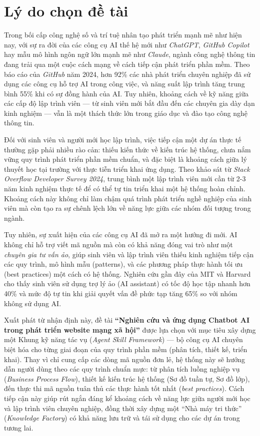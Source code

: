 \documentclass[13pt,a4paper,oneside]{extreport}
\numberwithin{equation}{chapter}
\numberwithin{figure}{chapter}
\numberwithin{table}{chapter}
\begin{document}
\section*{Lý do chọn đề tài}

Trong bối cấp công nghệ số và trí tuệ nhân tạo phát triển mạnh mẽ như hiện nay, với sự ra đời của các công cụ AI thế hệ mới như \textit{ChatGPT}, \textit{GitHub Copilot} hay mẫu mô hình ngôn ngữ lớn mạnh mẽ như \textit{Claude}, ngành công nghệ thông tin đang trải qua một cuộc cách mạng về cách tiếp cận phát triển phần mềm. Theo báo cáo của \textit{GitHub} năm 2024, hơn 92\% các nhà phát triển chuyên nghiệp đã sử dụng các công cụ hỗ trợ AI trong công việc, và năng suất lập trình tăng trung bình 55\% khi có sự đồng hành của AI. Tuy nhiên, khoảng cách về kỹ năng giữa các cấp độ lập trình viên — từ sinh viên mới bắt đầu đến các chuyên gia dày dạn kinh nghiệm — vẫn là một thách thức lớn trong giáo dục và đào tạo công nghệ thông tin.

Đối với sinh viên và người mới học lập trình, việc tiếp cận một dự án thực tế thường gặp phải nhiều rào cản: thiếu kiến thức về kiến trúc hệ thống, chưa nắm vững quy trình phát triển phần mềm chuẩn, và đặc biệt là khoảng cách giữa lý thuyết học tại trường với thực tiễn triển khai ứng dụng. Theo khảo sát từ \textit{Stack Overflow Developer Survey 2024}, trung bình một lập trình viên mới cần từ 2-3 năm kinh nghiệm thực tế để có thể tự tin triển khai một hệ thống hoàn chỉnh. Khoảng cách này không chỉ làm chậm quá trình phát triển nghề nghiệp của sinh viên mà còn tạo ra sự chênh lệch lớn về năng lực giữa các nhóm đối tượng trong ngành.

Tuy nhiên, sự xuất hiện của các công cụ AI đã mở ra một hướng đi mới. AI không chỉ hỗ trợ viết mã nguồn mà còn có khả năng đóng vai trò như một \textit{chuyên gia tư vấn ảo}, giúp sinh viên và lập trình viên thiếu kinh nghiệm tiếp cận các quy trình, mô hình mẫu (patterns), và các phương pháp thực hành tối ưu (best practices) một cách có hệ thống. Nghiên cứu gần đây của MIT và Harvard cho thấy sinh viên sử dụng trợ lý ảo (AI assistant) có tốc độ học tập nhanh hơn 40\% và mức độ tự tin khi giải quyết vấn đề phức tạp tăng 65\% so với nhóm không sử dụng AI.

Xuất phát từ nhận định này, đề tài \textbf{“Nghiên cứu và ứng dụng Chatbot AI trong phát triển website mạng xã hội”} được lựa chọn với mục tiêu xây dựng một Khung kỹ năng tác vụ (\textit{Agent Skill Framework}) — bộ công cụ AI chuyên biệt hóa cho từng giai đoạn của quy trình phần mềm (phân tích, thiết kế, triển khai). Thay vì chỉ cung cấp các dòng mã nguồn đơn lẻ, hệ thống này sẽ hướng dẫn người dùng theo các quy trình chuẩn mực: từ phân tích luồng nghiệp vụ (\textit{Business Process Flow}), thiết kế kiến trúc hệ thống (Sơ đồ tuần tự, Sơ đồ lớp), đến thực thi mã nguồn tuân thủ các thực hành tốt nhất (\textit{best practices}). Cách tiếp cận này giúp rút ngắn đáng kể khoảng cách về năng lực giữa người mới học và lập trình viên chuyên nghiệp, đồng thời xây dựng một “Nhà máy tri thức” (\textit{Knowledge Factory}) có khả năng lưu trữ và tái sử dụng cho các dự án trong tương lai.
\end{document}
